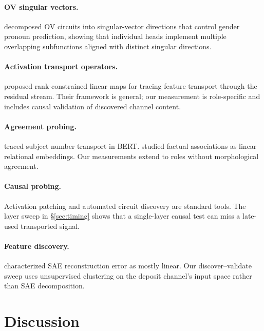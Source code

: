 \documentclass[11pt,a4paper]{article}
\begin{document}
\paragraph{OV singular vectors.}
\citet{ahmad2025beyond} decomposed OV circuits into singular-vector directions that control
gender pronoun prediction, showing that individual heads implement multiple overlapping
subfunctions aligned with distinct singular directions.

\paragraph{Activation transport operators.}
\citet{szablewski2025activation} proposed rank-constrained linear maps for tracing feature
transport through the residual stream. Their framework is general; our measurement is
role-specific and includes causal validation of discovered channel content.

\paragraph{Agreement probing.}
\citet{hao2023verb} traced subject number transport in BERT. \citet{hernandez2024linearity}
studied factual associations as linear relational embeddings. Our measurements extend to
roles without morphological agreement.

\paragraph{Causal probing.}
Activation patching \citep{meng2022locating} and automated circuit discovery
\citep{conmy2023towards} are standard tools. The layer sweep in \S\ref{sec:timing} shows
that a single-layer causal test can miss a late-used transported signal.

\paragraph{Feature discovery.}
\citet{engels2024not} characterized SAE reconstruction error as mostly linear. Our
discover--validate sweep uses unsupervised clustering on the deposit channel's input space
rather than SAE decomposition.

\section{Discussion}
\label{sec:discussion}
\end{document}
